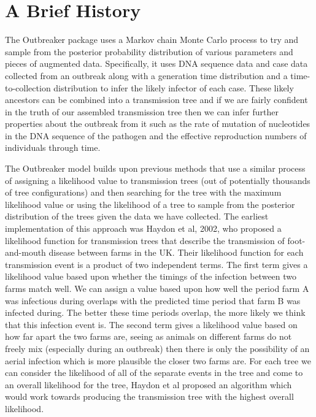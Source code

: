 \documentclass[11pt,a4paper]{report}
\begin{document}
\section{A Brief History}
The Outbreaker package uses a Markov chain Monte Carlo process to try and sample from the posterior probability distribution of various parameters and pieces of augmented data. Specifically, it uses DNA sequence data and case data collected from an outbreak along with a generation time distribution and a time-to-collection distribution to infer the likely infector of each case. These likely ancestors can be combined into a transmission tree and if we are fairly confident in the truth of our assembled transmission tree then we can infer further properties about the outbreak from it such as the rate of mutation of nucleotides in the DNA sequence of the pathogen and the effective reproduction numbers of individuals through time.

The Outbreaker model builds upon previous methods that use a similar process of assigning a likelihood value to transmission trees (out of potentially thousands of tree configurations) and then searching for the tree with the maximum likelihood value or using the likelihood of a tree to sample from the posterior distribution of the trees given the data we have collected. The earliest implementation of this approach was Haydon et al, 2002, who proposed a likelihood function for transmission trees that describe the transmission of foot-and-mouth disease between farms in the UK. Their likelihood function for each transmission event is a product of two independent terms. The first term gives a likelihood value based upon whether the timings of the infection between two farms match well. We can assign a value based upon how well the period farm A was infectious during overlaps with the predicted time period that farm B was infected during. The better these time periods overlap, the more likely we think that this infection event is. The second term gives a likelihood value based on how far apart the two farms are, seeing as animals on different farms do not freely mix (especially during an outbreak) then there is only the possibility of an aerial infection which is more plausible the closer two farms are. For each tree we can consider the likelihood of all of the separate events in the tree and come to an overall likelihood for the tree, Haydon et al proposed an algorithm which would work towards producing the transmission tree with the highest overall likelihood.
\end{document}
